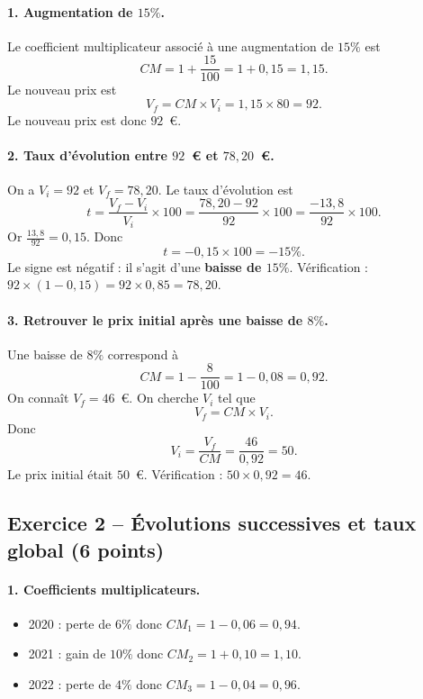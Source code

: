 \documentclass[12pt,a4paper]{article}
\begin{document}
\paragraph{1. Augmentation de \(15\%\).}
Le coefficient multiplicateur associé à une augmentation de \(15\%\) est
\[
CM = 1 + \frac{15}{100} = 1 + 0{,}15 = 1{,}15.
\]
Le nouveau prix est
\[
V_f = CM \times V_i = 1{,}15 \times 80 = 92.
\]
Le nouveau prix est donc \(92\)~\euro{}.

\paragraph{2. Taux d'évolution entre \(92\)~\euro{} et \(78{,}20\)~\euro{}.}
On a \(V_i = 92\) et \(V_f = 78{,}20\). Le taux d'évolution est
\[
t = \frac{V_f - V_i}{V_i} \times 100
= \frac{78{,}20 - 92}{92} \times 100
= \frac{-13{,}8}{92} \times 100.
\]
Or \(\frac{13{,}8}{92} = 0{,}15\). Donc
\[
t = -0{,}15 \times 100 = -15\%.
\]
Le signe est négatif : il s'agit d'une \textbf{baisse de \(15\%\)}.  
Vérification : \(92 \times (1 - 0{,}15) = 92 \times 0{,}85 = 78{,}20\).

\paragraph{3. Retrouver le prix initial après une baisse de \(8\%\).}
Une baisse de \(8\%\) correspond à
\[
CM = 1 - \frac{8}{100} = 1 - 0{,}08 = 0{,}92.
\]
On connaît \(V_f = 46\)~\euro{}. On cherche \(V_i\) tel que
\[
V_f = CM \times V_i.
\]
Donc
\[
V_i = \frac{V_f}{CM} = \frac{46}{0{,}92} = 50.
\]
Le prix initial était \(50\)~\euro{}.  
Vérification : \(50 \times 0{,}92 = 46\).

\subsection*{Exercice 2 -- Évolutions successives et taux global (6 points)}

\paragraph{1. Coefficients multiplicateurs.}
\begin{itemize}
    \item 2020 : perte de \(6\%\) donc \(CM_1 = 1 - 0{,}06 = 0{,}94\).
    \item 2021 : gain de \(10\%\) donc \(CM_2 = 1 + 0{,}10 = 1{,}10\).
    \item 2022 : perte de \(4\%\) donc \(CM_3 = 1 - 0{,}04 = 0{,}96\).
\end{itemize}
\end{document}

